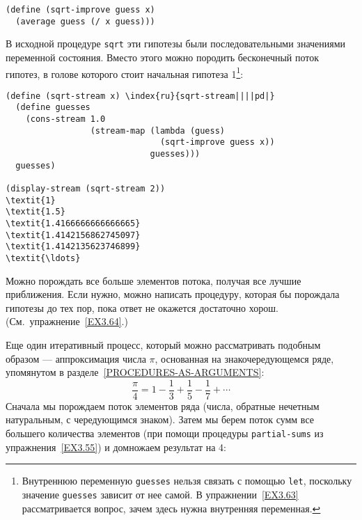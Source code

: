 \begin{Verbatim}[fontsize=\small]
(define (sqrt-improve guess x)
  (average guess (/ x guess)))
\end{Verbatim}

 В исходной процедуре {\tt sqrt} эти гипотезы были
последовательными значениями переменной состояния.  Вместо этого можно
породить бесконечный поток гипотез, в голове которого стоит начальная
гипотеза 1\footnote{Внутреннюю переменную {\tt guesses} нельзя
связать с помощью {\tt let}, поскольку значение
{\tt guesses} зависит от нее самой.  В
упражнении~\ref{EX3.63} рассматривается вопрос, зачем здесь нужна
внутренняя переменная.
}:

\begin{Verbatim}[fontsize=\small]
(define (sqrt-stream x) \index{ru}{sqrt-stream||||pd|}
  (define guesses
    (cons-stream 1.0
                 (stream-map (lambda (guess)
                               (sqrt-improve guess x))
                             guesses)))
  guesses)

(display-stream (sqrt-stream 2))
\textit{1}
\textit{1.5}
\textit{1.4166666666666665}
\textit{1.4142156862745097}
\textit{1.4142135623746899}
\textit{\ldots}
\end{Verbatim}
Можно порождать все больше элементов потока, получая все лучшие
приближения.  Если нужно, можно написать процедуру, которая бы
порождала гипотезы до тех пор, пока ответ не окажется достаточно
хорош. (См.~упражнение~\ref{EX3.64}.)

Еще один итеративный процесс, который можно рассматривать
подобным образом ---   аппроксимация числа $\pi$, основанная
на знакочередующемся ряде, упомянутом в разделе~\ref{PROCEDURES-AS-ARGUMENTS}:
$$
\frac{\pi}{4} = 1 - \frac{1}{3} + \frac{1}{5} - \frac{1}{7} + \cdots
$$
Сначала мы порождаем поток элементов ряда (числа, обратные нечетным
натуральным, с чередующимся знаком).  Затем мы берем поток сумм все
большего количества элементов (при помощи процедуры
{\tt partial-sums} из упражнения~\ref{EX3.55}) и
домножаем результат на 4:

